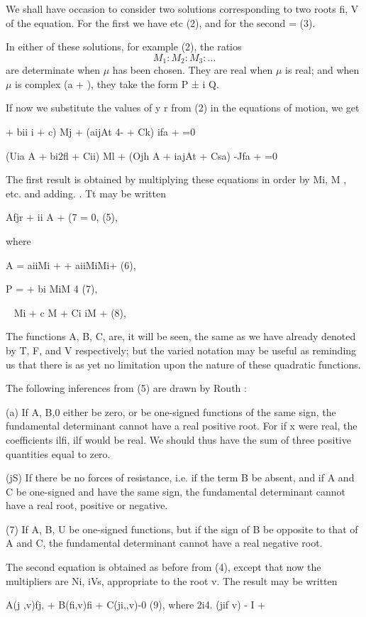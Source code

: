 We shall have occasion to consider two solutions corresponding
to two roots fi, V of the equation. For the first we have
etc
(2),
and for the second
= (3).

In either of these solutions, for example (2), the ratios
\[ M_1 : M_2 : M_3 : \ldots \]
are determinate when
\(\mu \) has been chosen. They are real when
\(\mu \) is real; and when
\(\mu \) is complex (a + ), they take the form
P ± i Q.

If now we substitute the values of y r from (2) in the equations
of motion, we get

+ bii i + c) Mj + (aijAt 4- + Ck) ifa + =0

(Uia A + bi2fl + Cii) Ml + (Ojh A + iajAt + Csa) -Jfa + =0

The first result is obtained by multiplying these equations in
order by Mi, M , etc. and adding. . Tt may be written

Afjr + ii A + (7 = 0, (5),

where

A = aiiMi + + aiiMiMi+ (6),

P = + bi MiM 4 (7),

 ~    Mi + c M + Ci iM + (8),

The functions A, B, C, are, it will be seen, the same as we have
already denoted by T, F, and V respectively; but the varied
notation may be useful as reminding us that there is as yet no
limitation upon the nature of these quadratic functions.

The following inferences from (5) are drawn by Routh :

(a) If A, B,0 either be zero, or be one-signed functions of
the same sign, the fundamental determinant cannot have a real
positive root. For if x were real, the coefficients ilfi, ilf
would be real. We should thus have the sum of three positive
quantities equal to zero.

(jS) If there be no forces of resistance, i.e. if the term B be
absent, and if A and C be one-signed and have the same sign,
the fundamental determinant cannot have a real root, positive or
negative.

(7) If A, B, U be one-signed functions, but if the sign of
B be opposite to that of A and C, the fundamental determinant
cannot have a real negative root.

The second equation is obtained as before from (4), except that
now the multipliers are Ni, iVs, appropriate to the root v. The
result may be written

A(j ,v)fj, + B(fi,v)fi + C(ji,,v)-0 (9),
where 2i4. (jif v) - I +

